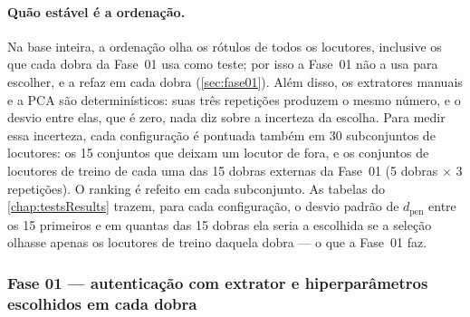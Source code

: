 				\paragraph{Quão estável é a ordenação.} Na base inteira, a ordenação olha os rótulos de todos os locutores, inclusive os que cada dobra da Fase~01 usa como teste; por isso a Fase~01 não a usa para escolher, e a refaz em cada dobra (\autoref{sec:fase01}). Além disso, os extratores manuais e a \ac{PCA} são determinísticos: suas três repetições produzem o mesmo número, e o desvio entre elas, que é zero, nada diz sobre a incerteza da escolha. Para medir essa incerteza, cada configuração é pontuada também em 30 subconjuntos de locutores: os 15 conjuntos que deixam um locutor de fora, e os conjuntos de locutores de treino de cada uma das 15 dobras externas da Fase~01 (5 dobras $\times$ 3 repetições). O ranking é refeito em cada subconjunto. As tabelas do \autoref{chap:testsResults} trazem, para cada configuração, o desvio padrão de $d_{\text{pen}}$ entre os 15 primeiros e em quantas das 15 dobras ela seria a escolhida se a seleção olhasse apenas os locutores de treino daquela dobra --- o que a Fase~01 faz.

			\subsubsection{Fase 01 --- autenticação com extrator e hiperparâmetros escolhidos em cada dobra}
				\label{sec:fase01}

